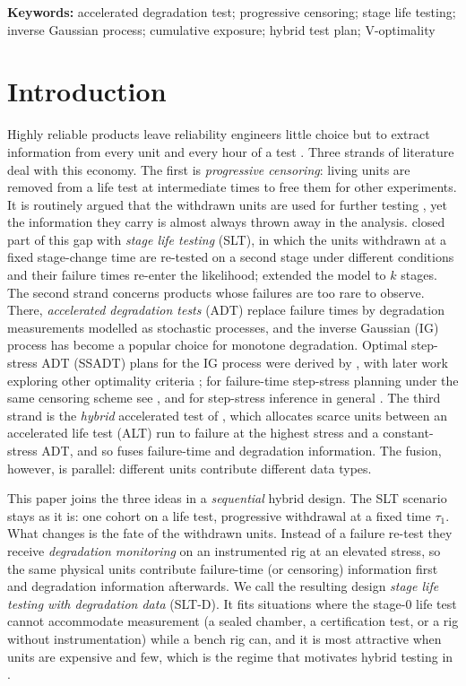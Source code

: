 \documentclass[11pt]{article}
\newcommand{\SLTD}{SLT-D}
\begin{document}
\noindent\textbf{Keywords:} accelerated degradation test; progressive censoring; stage life
testing; inverse Gaussian process; cumulative exposure; hybrid test plan; V-optimality

\section{Introduction}\label{sec:intro}

Highly reliable products leave reliability engineers little choice but to extract
information from every unit and every hour of a test
\citep{MeekerEscobar1998,Nelson2004}. Three strands of literature deal with this economy. The
first is \emph{progressive censoring}: living units are removed from a life test at
intermediate times to free them for other experiments. It is routinely argued that the
withdrawn units are used for further testing
\citep{BalakrishnanAggarwala2000,BalakrishnanCramer2014}, yet the information they carry is
almost always thrown away in the analysis. \citet{LaumenCramer2019} closed part of this gap
with \emph{stage life testing} (SLT), in which the units withdrawn at a fixed stage-change
time are re-tested on a second stage under different conditions and their failure times
re-enter the likelihood; \citet{LaumenCramer2021} extended the model to $k$ stages. The
second strand concerns products whose failures are too rare to observe. There,
\emph{accelerated degradation tests} (ADT) replace failure times by degradation measurements
modelled as stochastic processes, and the inverse Gaussian (IG) process
\citep{WangXu2010,YeChen2014} has become a popular choice for monotone degradation. Optimal
step-stress ADT (SSADT) plans for the IG process were derived by \citet{WangWangDuan2016},
with later work exploring other optimality criteria \citep{Yan2023,Tang2025}; for
failure-time step-stress planning under the same censoring scheme see
\citet{Gouno2004}, and for step-stress inference in general \citet{KunduGanguly2017}. The
third strand is the \emph{hybrid} accelerated test of \citet{Ma2021}, which allocates scarce
units between an accelerated life test (ALT) run to failure at the highest stress and a
constant-stress ADT, and so fuses failure-time and degradation information. The fusion,
however, is parallel: different units contribute different data types.

This paper joins the three ideas in a \emph{sequential} hybrid design. The SLT scenario
stays as it is: one cohort on a life test, progressive withdrawal at a fixed time $\tau_1$.
What changes is the fate of the withdrawn units. Instead of a failure re-test they receive
\emph{degradation monitoring} on an instrumented rig at an elevated stress, so the same
physical units contribute failure-time (or censoring) information first and degradation
information afterwards. We call the resulting design \emph{stage life testing with degradation
data} (\SLTD{}). It fits situations where the stage-0 life test cannot accommodate
measurement (a sealed chamber, a certification test, or a rig without instrumentation) while a
bench rig can, and it is most attractive when units are expensive and few, which is the regime
that motivates hybrid testing in \citet{Ma2021}.
\end{document}
